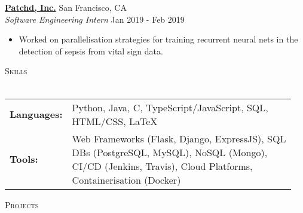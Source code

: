 \documentclass[a4paper]{article}
\newcommand{\lineunder} {
    \vspace*{-8pt} \\
    \hspace*{-10pt} \hrulefill \\
}
\newcommand{\header} [1] {
    {\hspace*{-10pt}\vspace*{6pt} \textsc{#1}}
    \vspace*{-6pt} \lineunder
}
\newenvironment{myitemize}
{   \small
    \vspace{-2pt}
    \begin{itemize}
    \setlength{\itemsep}{0pt}
    \setlength{\parskip}{0pt}
    \setlength{\parsep}{0pt}     }
{ \end{itemize}                  }
\begin{document}
\vspace{-0.5mm}

\textbf{\href{https://www.patchdmedical.com/}{Patchd, Inc.}} \hfill San Francisco, CA\\
\textit{Software Engineering Intern} \hfill  Jan 2019 - Feb 2019\\
\begin{myitemize} \itemsep 0.5mm
	\item Worked on parallelisation strategies for training recurrent neural nets in the detection of sepsis from vital sign data.
\end{myitemize}


\vspace{-0.5mm}
\header{Skills}
\vspace{1mm}
\begin{tabular}{p{0.12\linewidth}p{0.83\linewidth}}
	\textbf{Languages:} & Python, Java, C, TypeScript/JavaScript, SQL, HTML/CSS, \LaTeX \\
	\textbf{Tools:} & Web Frameworks (Flask, Django, ExpressJS), SQL DBs (PostgreSQL, MySQL), NoSQL (Mongo), CI/CD (Jenkins, Travis), Cloud Platforms, Containerisation (Docker)
\end{tabular}

\vspace{0mm}

\header{Projects}
\end{document}
